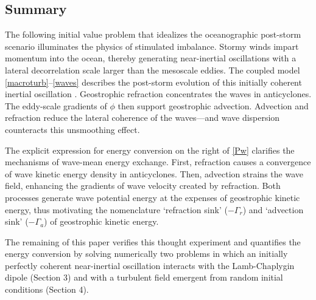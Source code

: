 \documentclass{jfm}
\begin{document}
\subsection{Summary}
The following initial value problem that idealizes the oceanographic post-storm scenario
illuminates the physics of stimulated imbalance. Stormy winds impart momentum
into the ocean, thereby generating near-inertial oscillations with a lateral
decorrelation scale larger than the mesoscale eddies. The coupled model
\eqref{macroturb}--\eqref{waves} describes the post-storm evolution
of this initially coherent inertial oscillation
 \citep{xie_vanneste2015}. Geostrophic refraction
concentrates the waves in anticyclones. The eddy-scale gradients of $\phi$ then support
geostrophic advection. Advection and refraction reduce the lateral coherence
of the waves---and wave dispersion counteracts this unsmoothing effect.

The explicit expression for energy
conversion on the right of \eqref{Pw} clarifies the mechanisms of wave-mean energy
exchange. First, refraction causes a convergence of wave kinetic energy density in
anticyclones. Then, advection strains the wave field, enhancing the gradients of
wave velocity created by refraction. Both
processes generate wave potential energy at the expenses of geostrophic kinetic
energy, thus motivating the nomenclature `refraction sink' ($-\Gamma_r$) and
`advection sink' ($-\Gamma_a$)  of geostrophic kinetic energy.

The remaining of this paper verifies this thought experiment and quantifies the
energy conversion by solving
numerically two problems in which an initially perfectly coherent near-inertial
oscillation interacts with the Lamb-Chaplygin dipole (Section 3) and with a turbulent
field emergent from random initial conditions (Section 4).
\end{document}
